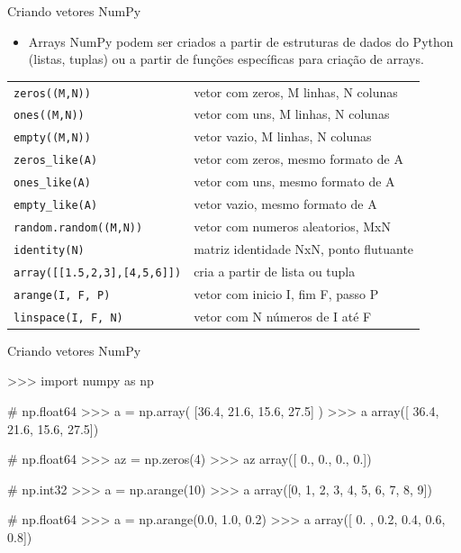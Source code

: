 \documentclass[12pt,t,graphics]{beamer}
\begin{document}
\begin{frame}[t]{Criando vetores NumPy}
	\begin{itemize}
		\item Arrays NumPy podem ser criados a partir de estruturas de dados do
		Python (listas, tuplas) ou a partir de funções específicas para 
		criação de arrays.
	\end{itemize}
	\begin{scriptsize}
		\begin{table}
			\centering
			\begin{tabular}[c]{|l||l|}
				\hline
				\texttt{zeros((M,N))} & vetor com zeros, M linhas, N colunas \\
				\texttt{ones((M,N))}  & vetor com uns, M linhas, N colunas\\
				\texttt{empty((M,N))} & vetor vazio, M linhas, N colunas\\
				\hline
				\texttt{zeros\_like(A)} & vetor com zeros, mesmo formato de A\\
				\texttt{ones\_like(A)}  & vetor com uns, mesmo formato de A\\
				\texttt{empty\_like(A)} & vetor vazio, mesmo formato de A\\
				\hline
				\texttt{random.random((M,N))} & vetor com numeros aleatorios, MxN\\
				\texttt{identity(N)}    & matriz identidade NxN, ponto flutuante\\
				\texttt{array([[1.5,2,3],[4,5,6]])} & cria a partir de lista ou tupla\\ 
				\hline
				\texttt{arange(I, F, P)}   & vetor com inicio I, fim F, passo P\\
				\texttt{linspace(I, F, N)} & vetor com N números de I até F\\
				\hline
			\end{tabular}
		\end{table}
	\end{scriptsize}
	
\end{frame}

\begin{frame}[t,fragile]{Criando vetores NumPy}
	\begin{python}
>>> import numpy as np

# np.float64
>>> a = np.array( [36.4, 21.6, 15.6, 27.5] )  
>>> a
array([ 36.4,  21.6,  15.6,  27.5])

# np.float64	
>>> az = np.zeros(4)                          
>>> az
array([ 0., 0., 0., 0.])

# np.int32	
>>> a = np.arange(10)                         
>>> a
array([0, 1, 2, 3, 4, 5, 6, 7, 8, 9])

# np.float64	
>>> a = np.arange(0.0, 1.0, 0.2)              
>>> a
array([ 0. ,  0.2,  0.4,  0.6,  0.8])
	\end{python}
\end{frame}
\end{document}

